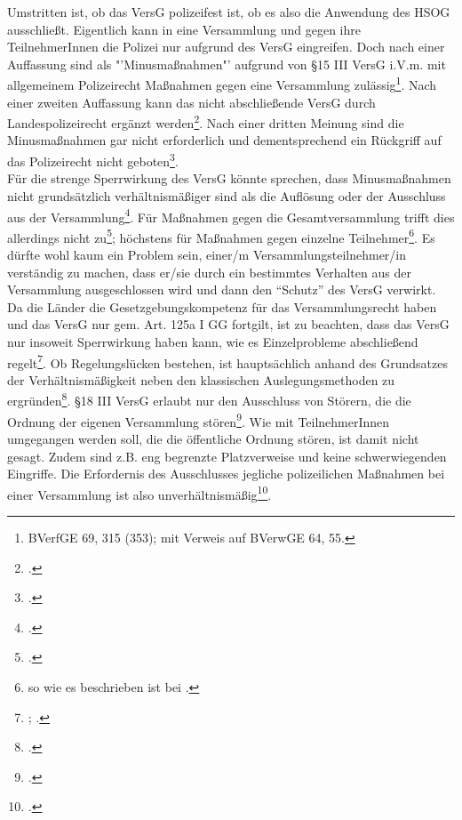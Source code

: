 \documentclass[widefront, ngerman]{jura}
\begin{document}
Umstritten ist, ob das VersG polizeifest ist, ob es also die Anwendung des HSOG ausschließt. Eigentlich kann in eine Versammlung und gegen ihre TeilnehmerInnen die Polizei nur aufgrund des VersG eingreifen. Doch nach einer Auffassung sind als "'Minusmaßnahmen"' aufgrund von §15 III VersG i.V.m. mit allgemeinem Polizeirecht Maßnahmen gegen eine Versammlung zulässig\footnote{BVerfGE 69, 315 (353); mit Verweis auf BVerwGE 64, 55.}. Nach einer zweiten Auffassung kann das nicht abschließende VersG durch Landespolizeirecht ergänzt werden\footcite{schnurVR2000}. Nach einer dritten Meinung sind die Minusmaßnahmen gar nicht erforderlich und dementsprechend ein Rückgriff auf das Polizeirecht nicht geboten\footcite[§20 Rn 15]{PierothSchlinkPolizei}.\\
Für die strenge Sperrwirkung des VersG könnte sprechen, dass Minusmaßnahmen nicht grundsätzlich verhältnismäßiger sind als die Auflösung oder der Ausschluss aus der Versammlung\footcite[Kniesel/Poscher][J Rn 29f.]{HandbuchPolizeirecht}.
Für Maßnahmen gegen die Gesamtversammlung trifft dies allerdings nicht zu\footcite[(721) Fn 5]{schwabeDesaster}; höchstens für Maßnahmen gegen einzelne Teilnehmer\footnote{so wie es beschrieben ist bei \cite[Kniesel/Poscher][J Rn 29f.]{HandbuchPolizeirecht}.}. Es dürfte wohl kaum ein Problem sein, einer/m Versammlungsteilnehmer/in verständig zu machen, dass er/sie durch ein bestimmtes Verhalten aus der Versammlung ausgeschlossen wird und dann den "`Schutz"' des VersG verwirkt.
Da die Länder die Gesetzgebungskompetenz für das Versammlungsrecht haben und das VersG nur gem. Art. 125a I GG fortgilt, ist zu beachten, dass das VersG nur insoweit Sperrwirkung haben kann, wie es Einzelprobleme abschließend regelt\footnote{\cite[(118)]{schnurVR2000}; \cite[Kniesel/Poscher][J Rn 19f., 147]{HandbuchPolizeirecht}.}. Ob Regelungslücken bestehen, ist hauptsächlich anhand des Grundsatzes der Verhältnismäßigkeit neben den klassischen Auslegungsmethoden zu ergründen\footcite[(118)]{schnurVR2000}.
§18 III VersG erlaubt nur den Ausschluss von Störern, die die Ordnung der eigenen Versammlung stören\footcite[§18 Rn 32ff.]{DietelGintzelKniesel}. Wie mit TeilnehmerInnen umgegangen werden soll, die die öffentliche Ordnung stören, ist damit nicht gesagt. Zudem sind z.B. eng begrenzte Platzverweise und keine schwerwiegenden Eingriffe. Die Erfordernis des Ausschlusses jegliche polizeilichen Maßnahmen bei einer Versammlung ist also unverhältnismäßig\footcite[(723)]{schwabeDesaster}.\\
\end{document}
